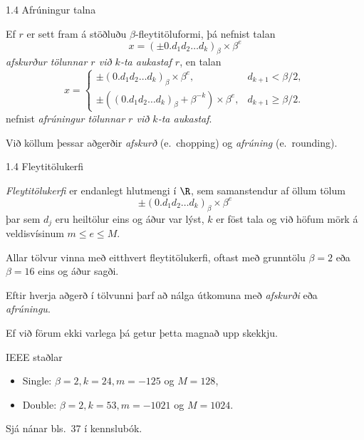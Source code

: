 %
%
\begin{frame}{1.4 Afrúningur talna} 

Ef $r$ er sett fram á stöðluðu $\beta$-fleytitöluformi, þá nefnist talan
\begin{equation*}
    x = (\pm 0.d_1d_2\dots d_k)_\beta\times \beta^e
\end{equation*}
{\it afskurður tölunnar $r$ við $k$-ta aukastaf $r$},  \pause en talan
\begin{equation*}
    x = \begin{cases} 
    \pm (0.d_1d_2\dots d_k)_\beta\times \beta^e, & 
    d_{k+1}<\beta/2,\\
    \pm ((0.d_1d_2\dots d_k)_\beta+\beta^{-k})\times \beta^e,
    &d_{k+1}\geq \beta/2.
    \end{cases}
\end{equation*}
nefnist {\it afrúningur tölunnar $r$ við $k$-ta aukastaf}.

\pause
Við  köllum þessar aðgerðir {\it afskurð} (e.~chopping) og {\it afrúning}
(e.~rounding).  
\end{frame}
%
%
\begin{frame}{1.4 Fleytitölukerfi}
 
{\it Fleytitölukerfi} er endanlegt hlutmengi í $\R$, sem samanstendur
af öllum tölum  
\begin{equation*}
    \pm (0.d_1d_2\dots d_k)_\beta\times \beta^e
\end{equation*}
þar sem $d_j$ eru heiltölur eins og áður var lýst, $k$ er föst tala
og við höfum mörk á veldisvísinum $m\leq e\leq M$. \pause


Allar tölvur vinna með eitthvert fleytitölukerfi, oftast
með grunntölu $\beta=2$ eða $\beta=16$ eins og áður sagði.

\pause
Eftir hverja aðgerð í tölvunni þarf að nálga útkomuna með 
{\it afskurði} eða {\it afrúningu}. 

\pause
Ef við förum ekki varlega þá getur þetta magnað upp skekkju.

\pause
\begin{block}{IEEE staðlar}
\begin{itemize}
 \item Single: $\beta = 2, k=24, m=-125$ og $M = 128$,
 \item Double: $\beta = 2, k=53, m=-1021$ og $M=1024$.
\end{itemize}
Sjá nánar bls.~37 í kennslubók.
\end{block}\end{frame}
%
%
